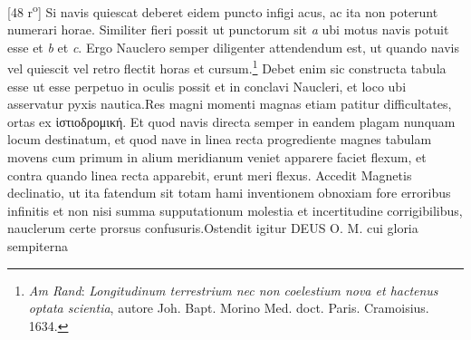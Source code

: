 [48 r\textsuperscript{o}] Si navis\protect{} quiescat deberet eidem puncto infigi acus\protect{}, ac ita non poterunt numerari horae. Similiter fieri possit ut  punctorum sit \textit{a} ubi motus navis\protect{} potuit esse et \textit{b} et \textit{c}. Ergo Nauclero semper diligenter attendendum est, ut quando navis\protect{} vel quiescit vel retro flectit  horas et cursum.\footnote{\textit{Am Rand}: \cite{00080}\textit{Longitudinum terrestrium nec non coelestium nova et hactenus optata scientia}, autore Joh. Bapt. Morino\protect{} Med. doct. Paris\protect{}. Cramoisius\protect{}. 1634.} Debet enim sic constructa tabula esse ut esse perpetuo in oculis possit et in conclavi Naucleri, et loco ubi asservatur pyxis nautica\protect{}.\pend \pstart Res magni momenti magnas etiam patitur difficultates, ortas ex ἱστιοδρομική. Et quod navis\protect{} directa semper in eandem plagam  nunquam  locum destinatum, et quod nave\protect{} in linea recta progrediente magnes\protect{} tabulam movens cum primum in alium meridianum\protect{} veniet apparere faciet flexum, et contra quando linea recta apparebit, erunt meri flexus. Accedit Magnetis\protect{} declinatio\protect{}, ut ita fatendum sit totam hami inventionem obnoxiam fore erroribus infinitis et non nisi summa supputationum molestia et incertitudine corrigibilibus, nauclerum certe prorsus confusuris.\pend \pstart Ostendit igitur DEUS O. M. cui gloria sempiterna
